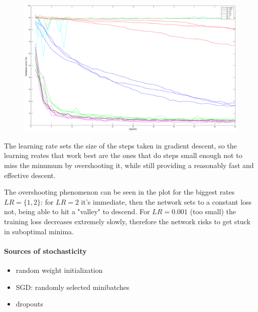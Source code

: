 \documentclass{article}
\begin{document}
    \begin{figure}[!htb]
        \centering
        \includegraphics[width=\textwidth]{figures/sc1_val_err}
    \end{figure}
    
    The learning rate sets the size of the steps taken in gradient descent, so the learning reates that work best are the ones that do steps small enough not to miss the minumum by overshooting it,
    while still providing a reasonably fast and effective descent. 
    
    The overshooting phenomenon can be seen in the plot for the biggest rates $LR = \{1,2\}$: for $LR = 2$ it's immediate, then the network sets to a constant loss 
    not, being able to hit a "valley" to descend.
    For $LR = 0.001$ (too small) the training loss decreases extremely slowly, therefore the network risks to get stuck in suboptimal minima.
    
    \paragraph*{Sources of stochasticity}
        \begin{itemize}
        \item random weight initialization
        \item SGD: randomly selected minibatches
        \item dropouts
        \end{itemize}
    
    
    
    
\end{document}
